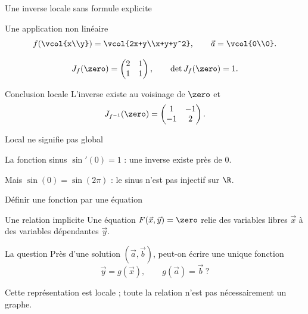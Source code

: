 \begin{frame}[t]{Une inverse locale sans formule explicite}
\coursanalyse
\begin{exemple}{Une application non linéaire}
\[f\!\left(\vcol{x\\y}\right)=\vcol{2x+y\\x+y+y^2},\qquad \vec a=\vcol{0\\0}.\]
\end{exemple}
\[J_f(\zero)=\begin{pmatrix}2&1\\1&1\end{pmatrix},\qquad\det J_f(\zero)=1.\]
\begin{resultat}{Conclusion locale}
L’inverse existe au voisinage de $\zero$ et
\[J_{f^{-1}}(\zero)=\begin{pmatrix}1&-1\\-1&2\end{pmatrix}.\]
\end{resultat}
\end{frame}

\begin{frame}[t]{Local ne signifie pas global}
\coursanalyse
\begin{exemple}{La fonction sinus}
$\sin'(0)=1$ : une inverse existe près de $0$.
\medskip\par Mais $\sin(0)=\sin(2\pi)$ : le sinus n’est pas injectif sur $\R$.
\end{exemple}
\begin{center}\end{center}
\end{frame}

\begin{frame}[t]{Définir une fonction par une équation}
\coursanalyse
\begin{notion}{Une relation implicite}
Une équation $F(\vec x,\vec y)=\zero$ relie des variables libres $\vec x$ à des variables dépendantes $\vec y$.
\end{notion}
\begin{cours}{La question}
Près d’une solution $(\vec a,\vec b)$, peut-on écrire une unique fonction
\[\vec y=g(\vec x),\qquad g(\vec a)=\vec b\ ?\]
\end{cours}\vfill Cette représentation est locale ; toute la relation n’est pas nécessairement un graphe.
\end{frame}

